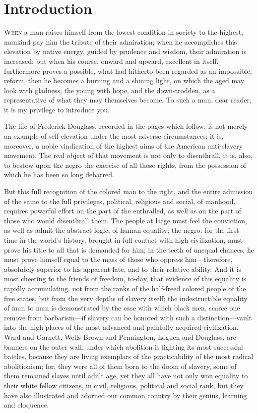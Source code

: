\chapter{Introduction}

\textsc{When} a man raises himself from the lowest condition in society
to the highest, mankind pay him the tribute of their admiration; when he
accomplishes this elevation by native energy, guided by prudence and
wisdom, their admiration is increased; but when his course, onward and
upward, excellent in itself, furthermore proves a possible, what had
hitherto been regarded as an impossible, reform, then he becomes a
burning and a shining light, on which the aged may look with gladness,
the young with hope, and the down-trodden, as a representative of what
they may themselves become. To such a man, dear reader, it is my
privilege to introduce you.

The life of Frederick Douglass, recorded in the pages which follow, is
not merely an example of self-elevation under the most adverse
circumstances; it is, moreover, a noble vindication of the highest aims
of the American anti-slavery movement. The real object of that movement
is not only to disenthrall, it is, also, to bestow upon the negro the
exercise of all those rights, from the possession of which he has been
so long debarred.

But this full recognition of the colored man to the right, and the
entire admission of the same to the full privileges, political,
religious and social, of manhood, requires powerful effort on the part
of the enthralled, as well as on the part of those who would disenthrall
them. The people at large must feel the conviction, as well as admit the
abstract logic, of human equality; the negro, for the first time in the
world's history, brought in full contact with high civilization, must
prove his title to all that is demanded for him; in the teeth of unequal
chances, he must prove himself equal to the mass of those who oppress
him---therefore, absolutely superior to his apparent fate, and to their
relative ability. And it is most cheering to the friends of freedom,
to-day, that evidence of this equality is
{\protect\hypertarget{xviii}{}{}}rapidly accumulating, not from the
ranks of the half-freed colored people of the free states, but from the
very depths of slavery itself; the indestructible equality of man to man
is demonstrated by the ease with which black men, scarce one remove from
barbarism---if slavery can be honored with such a distinction---vault
into the high places of the most advanced and painfully acquired
civilization. Ward and Garnett, Wells Brown and Pennington, Loguen and
Douglass, are banners on the outer wall, under which abolition is
fighting its most successful battles, because they are living exemplars
of the practicability of the most radical abolitionism; for, they were
all of them born to the doom of slavery, some of them remained slaves
until adult age, yet they all have not only won equality to their white
fellow citizens, in civil, religious, political and social rank, but
they have also illustrated and adorned our common country by their
genius, learning and eloquence.

